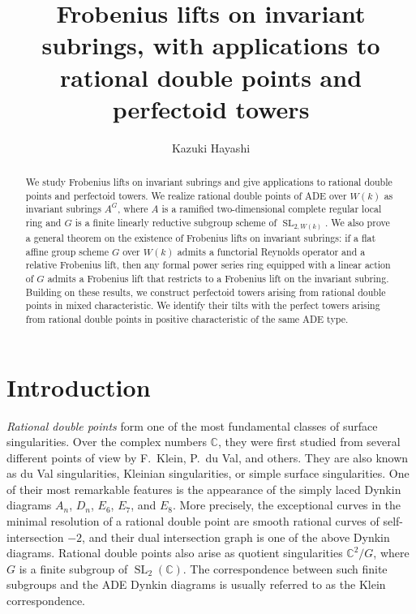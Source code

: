 \documentclass[uplatex,11pt,a4paper]{amsart} %
\numberwithin{equation}{section}
\numberwithin{figure}{section}
\numberwithin{table}{section}
\theoremstyle{plain}
\theoremstyle{definition}
\newcommand{\C}{\mathbb{C}}
\DeclareMathOperator{\SL}{SL}
\begin{document}
\title[Frobenius lifts on invariant subrings]{Frobenius lifts on invariant subrings, with applications to rational double points and perfectoid towers}
\author[K.~Hayashi]{Kazuki Hayashi}
\address{Department of Mathematics, Institute of Science Tokyo, 2-12-1 Ookayama, Meguro, Tokyo 152-8551}




\begin{abstract}
We study Frobenius lifts on invariant subrings and give applications to rational double points and perfectoid towers.
We realize rational double points of ADE over $W(k)$ as invariant subrings $A^G$, where $A$ is a ramified two-dimensional complete regular local ring and $G$ is a finite linearly reductive subgroup scheme of $\SL_{2,W(k)}$.
We also prove a general theorem on the existence of Frobenius lifts on invariant subrings: if a flat affine group scheme $G$ over $W(k)$ admits a functorial Reynolds operator and a relative Frobenius lift, then any formal power series ring equipped with a linear action of $G$ admits a Frobenius lift that restricts to a Frobenius lift on the invariant subring.
Building on these results, we construct perfectoid towers arising from rational double points in mixed characteristic. We identify their tilts with the perfect towers arising from rational double points in positive characteristic of the same ADE type.
\end{abstract}

\maketitle

\setcounter{tocdepth}{2}
\tableofcontents
\section{Introduction}

\emph{Rational double points} form one of the most fundamental classes of surface singularities. Over the complex numbers $\C$, they were first studied from several different points of view by F.~Klein, P.~du Val, and others. They are also known as du Val singularities, Kleinian singularities, or simple surface singularities. One of their most remarkable features is the appearance of the simply laced Dynkin diagrams $A_n$, $D_n$, $E_6$, $E_7$, and $E_8$. More precisely, the exceptional curves in the minimal resolution of a rational double point are smooth rational curves of self-intersection $-2$, and their dual intersection graph is one of the above Dynkin diagrams. Rational double points also arise as quotient singularities $\C^2/G$, where $G$ is a finite subgroup of $\SL_2(\C)$.  The correspondence between such finite subgroups and the ADE Dynkin diagrams is usually referred to as the Klein correspondence.
\end{document}
